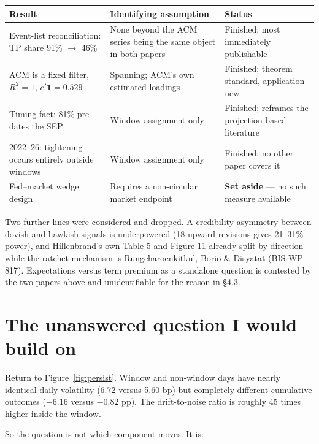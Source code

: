\documentclass[11pt]{article}
\begin{document}
\begin{center}\small
\begin{tabular}{@{}p{}p{}p{}@{}}
\toprule
\textbf{Result} & \textbf{Identifying assumption} & \textbf{Status}\\ \midrule
Event-list reconciliation: TP share 91\% $\to$ 46\% & None beyond the ACM series being the
same object in both papers & Finished; most immediately publishable\\[0.3em]
ACM is a fixed filter, $R^2=1$, $c'\mathbf 1 = 0.529$ & Spanning; ACM's own estimated loadings
& Finished; theorem standard, application new\\[0.3em]
Timing fact: 81\% pre-dates the SEP & Window assignment only & Finished; reframes the
projection-based literature\\[0.3em]
2022--26: tightening occurs entirely outside windows & Window assignment only & Finished; no
other paper covers it\\[0.3em]
Fed--market wedge design & Requires a non-circular market endpoint & \textbf{Set aside} --- no
such measure available\\
\bottomrule\end{tabular}
\end{center}

\vspace{0.3em}
\noindent Two further lines were considered and dropped. A credibility asymmetry between
dovish and hawkish signals is underpowered (18 upward revisions gives 21--31\% power), and
Hillenbrand's own Table 5 and Figure 11 already split by direction while the ratchet
mechanism is Rungcharoenkitkul, Borio \& Disyatat (BIS WP 817). Expectations versus term
premium as a standalone question is contested by the two papers above and unidentifiable for
the reason in \S4.3.

\section{The unanswered question I would build on}

Return to Figure~\ref{fig:persist}. Window and non-window days have nearly identical daily
volatility (6.72 versus 5.60 bp) but completely different cumulative outcomes ($-6.16$ versus
$-0.82$ pp). The drift-to-noise ratio is roughly 45 times higher inside the window.

So the question is not which component moves. It is:
\end{document}

